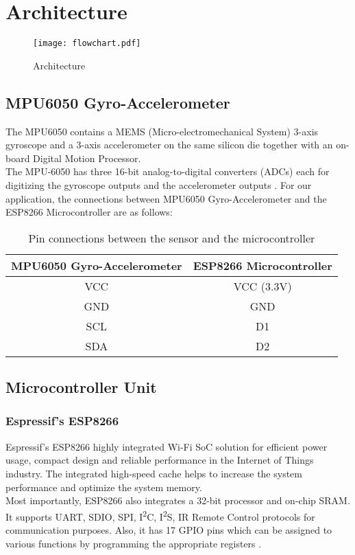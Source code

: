 \documentclass[./RTPostureTrackingReport.tex]{subfiles}
\begin{document}
\chapter{Architecture}\label{chap:arch}
\begin{figure}[H]
    \centering
    \texttt{[image: flowchart.pdf]}
    \caption{Architecture}
    \label{fig:architecture}
\end{figure}

\section{MPU6050 Gyro-Accelerometer}\label{sec:archmpu}
The MPU6050 contains a MEMS (Micro-electromechanical System) 3-axis gyroscope
and a 3-axis accelerometer on the same silicon die together with an on-board
Digital Motion Processor. \\ The MPU-6050 has three 16-bit analog-to-digital
converters (ADCs) each for digitizing the gyroscope outputs and the
accelerometer outputs \cite{mpudata}. For our application, the connections
between MPU6050 Gyro-Accelerometer and the ESP8266 Microcontroller are as
follows:

\begin{table}[H]
    \centering
    \begin{tabular}{|c|c|}
    \hline
    MPU6050 Gyro-Accelerometer & ESP8266 Microcontroller \\
    \hline
    VCC & VCC (3.3V) \\
    GND & GND \\
    SCL & D1 \\
    SDA & D2 \\
    \hline
    \end{tabular}
    \caption{Pin connections between the sensor and the microcontroller}
    \label{tab:pin}
\end{table}

\section{Microcontroller Unit}\label{sec:archuc}
\subsection{Espressif's ESP8266}
Espressif’s ESP8266 highly integrated Wi-Fi SoC solution for efficient power
usage, compact design and reliable performance in the Internet of Things
industry. The integrated high-speed cache helps to increase the system
performance and optimize the system memory. \\ Most importantly, ESP8266 also
integrates a 32-bit processor and on-chip SRAM.  It supports UART, SDIO, SPI,
I\textsuperscript{2}C, I\textsuperscript{2}S, IR Remote Control protocols for
communication purposes.  Also, it has 17 GPIO pins which can be assigned to
various functions by programming the appropriate registers \cite{espdata}.
\end{document}
